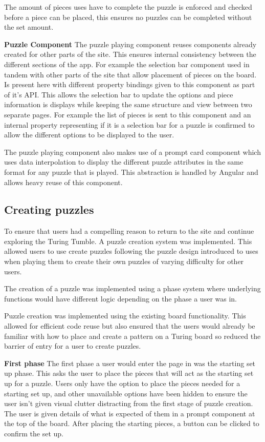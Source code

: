 \documentclass{l4proj}
\begin{document}
The amount of pieces uses have to complete the puzzle is enforced and checked before a piece can be placed, this ensures no puzzles can be completed without the set amount. 

\textbf{Puzzle Component}
The puzzle playing component reuses components already created for other parts of the site. This ensures internal consistency between the different sections of the app. For example the selection bar component used in tandem with other parts of the site that allow placement of pieces on the board. Is present here with different property bindings given to this component as part of it's API. This allows the selection bar to update the options and piece information is displays while keeping the same structure and view between two separate pages. For example the list of pieces is sent to this component and an internal property representing if it is a selection bar for a puzzle is confirmed to allow the different options to be displayed to the user.

The puzzle playing component also makes use of a prompt card component which uses data interpolation to display the different puzzle attributes in the same format for any puzzle that is played. This abstraction is handled by Angular and allows heavy reuse of this component.

\subsection{Creating puzzles}
To ensure that users had a compelling reason to return to the site and continue exploring the Turing Tumble. A puzzle creation system was implemented. This allowed users to use create puzzles following the puzzle design introduced to uses when playing them to create their own puzzles of varying difficulty for other users.

The creation of a puzzle was implemented using a phase system where underlying functions would have different logic depending on the phase a user was in. 

Puzzle creation was implemented using the existing board functionality. This allowed for efficient code reuse but also ensured that the users would already be familiar with how to place and create a pattern on a Turing board so reduced the barrier of entry for a user to create puzzles.

\textbf{First phase}
The first phase a user would enter the page in was the starting set up phase. This asks the user to place the pieces that will act as the starting set up for a puzzle. Users only have the option to place the pieces needed for a starting set up, and other unavailable options have been hidden to ensure the user isn't given visual clutter distracting from the first stage of puzzle creation. The user is given details of what is expected of them in a prompt component at the top of the board. After placing the starting pieces, a button can be clicked to confirm the set up. 
\end{document}
